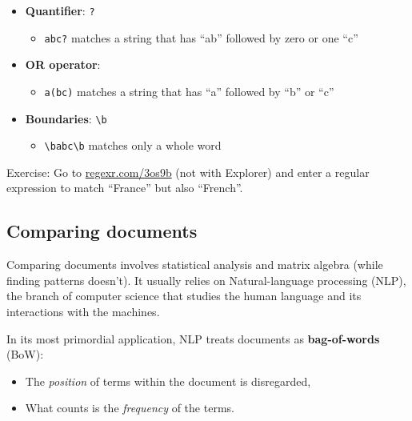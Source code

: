 \documentclass[
  letterpaper,
  DIV=11,
  numbers=noendperiod]{scrartcl}
\providecommand{\tightlist}{%
  \setlength{\itemsep}{0pt}\setlength{\parskip}{0pt}}
\begin{document}
\begin{itemize}
\tightlist
\item
  \textbf{Quantifier}: \texttt{?}

  \begin{itemize}
  \tightlist
  \item
    \texttt{abc?} matches a string that has ``ab'' followed by zero or
    one ``c''
  \end{itemize}
\item
  \textbf{OR operator}: \texttt{\textbar{}}

  \begin{itemize}
  \tightlist
  \item
    \texttt{a(b\textbar{}c)} matches a string that has ``a'' followed by
    ``b'' or ``c''
  \end{itemize}
\item
  \textbf{Boundaries}: \texttt{\textbackslash{}b}

  \begin{itemize}
  \tightlist
  \item
    \texttt{\textbackslash{}babc\textbackslash{}b} matches only a whole
    word
  \end{itemize}
\end{itemize}

{Exercise: Go to \href{https://regexr.com/3os9b}{regexr.com/3os9b} (not
with Explorer) and enter a regular expression to match ``France'' but
also ``French''.}

\subsection{Comparing documents}\label{comparing-documents}

Comparing documents involves statistical analysis and matrix algebra
(while finding patterns doesn't). It usually relies on Natural-language
processing (NLP), the branch of computer science that studies the human
language and its interactions with the machines.

In its most primordial application, NLP treats documents as
\textbf{bag-of-words} (BoW):

\begin{itemize}
\tightlist
\item
  The \emph{position} of terms within the document is disregarded,
\item
  What counts is the \emph{frequency} of the terms.
\end{itemize}
\end{document}
